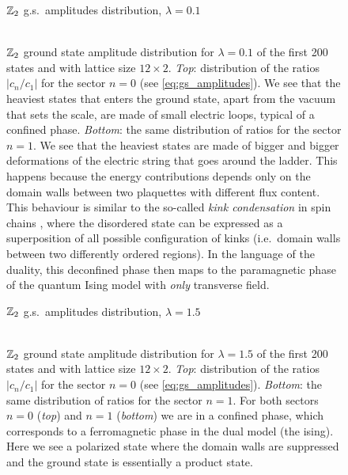 \begin{figure}[h]
    \centering
    \hspace{3em}$\Z_2$ g.s.~amplitudes distribution, $\lambda=0.1$ \\[5pt]
    \\[-2pt]\hspace{0.4pt}
    
    \caption[$\Z_2$ ground state amplitude distribution for $\lambda = 0.1$]{
        $\Z_2$ ground state amplitude distribution for $\lambda=0.1$ of the first 200 states and with lattice size $12 \times 2$.
        \emph{Top}: distribution of the ratios $|{c_n/c_1}|$ for the sector $n=0$ (see \eqref{eq:gs_amplitudes}).
        We see that the heaviest states that enters the ground state, apart from the vacuum that sets the scale, are made of small electric loops, typical of a confined phase.
        \emph{Bottom}: the same distribution of ratios for the sector $n=1$.
        We see that the heaviest states are made of bigger and bigger deformations of the electric string that goes around the ladder.
        This happens because the energy contributions depends only on the domain walls between two plaquettes with different flux content.
        This behaviour is similar to the so-called \emph{kink condensation} in spin chains \cite{fradkin1978order}, where the disordered state can be expressed as a superposition of all possible configuration of kinks (i.e.~domain walls between two differently ordered regions).
        In the language of the duality, this deconfined phase then maps to the paramagnetic phase of the quantum Ising model with \emph{only} transverse field.
    }
    \label{fig:gs_ampl_distr_0.1_Z2}
\end{figure}



\begin{figure}[h]
    \centering
    \hspace{3em}$\Z_2$ g.s.~amplitudes distribution, $\lambda=1.5$\\[5pt]
    \\[-2pt]\hspace{0.4pt}
    
    \caption[$\Z_2$ ground state amplitude distribution for $\lambda = 1.5$]{
        $\Z_2$ ground state amplitude distribution for $\lambda=1.5$ of the first 200 states and with lattice size $12 \times 2$.
        \emph{Top}: distribution of the ratios $|{c_n/c_1}|$ for the sector $n=0$ (see \eqref{eq:gs_amplitudes}).
        \emph{Bottom}: the same distribution of ratios for the sector $n=1$.
        For both sectors $n=0$ (\emph{top}) and $n=1$ (\emph{bottom}) we are in a confined phase, which corresponds to a ferromagnetic phase in the dual model (the \ac{ising}).
        Here we see a polarized state where the domain walls are suppressed and the ground state is essentially a product state.
    }
    \label{fig:gs_ampl_distr_1.5_Z2}
\end{figure}


